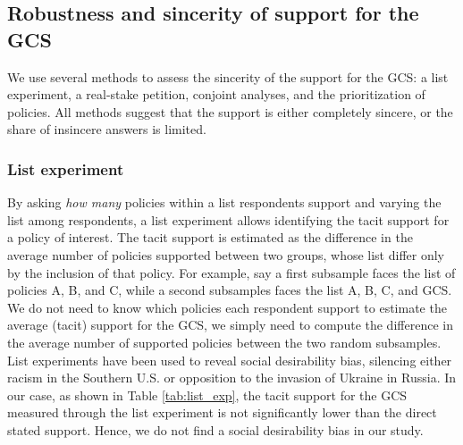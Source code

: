 


\subsection{Robustness and sincerity of support for the GCS}\label{subsec:robustness_sincerity}


We use several methods to assess the sincerity of the support for the GCS: a list experiment, a real-stake petition, conjoint analyses, and the prioritization of policies. All methods suggest that the support is either completely sincere, or the share of insincere answers is limited. 

\subsubsection{List experiment}\label{subsubsec:list_exp} %

By asking \textit{how many} policies within a list respondents support and varying the list among respondents, a list experiment allows identifying the tacit support for a policy of interest. The tacit support is estimated as the difference in the average number of policies supported between two groups, whose list differ only by the inclusion of that policy.\citep{hainmueller_causal_2014} %
For example, say a first subsample faces the list of policies A, B, and C, while a second subsamples faces the list A, B, C, and GCS. We do not need to know which policies each respondent support to estimate the average (tacit) support for the GCS, we simply need to compute the difference in the average number of supported policies between the two random subsamples. 
List experiments have been used to reveal social desirability bias, silencing either racism in the Southern U.S.\citep{kuklinski_racial_1997} or opposition to the invasion of Ukraine in Russia.\citep{chapkovski_solid_2022} %
In our case, as shown in Table \ref{tab:list_exp}, the tacit support for the GCS measured through the list experiment is not significantly lower than the direct stated support. %
Hence, we do not find a social desirability bias in our study.

